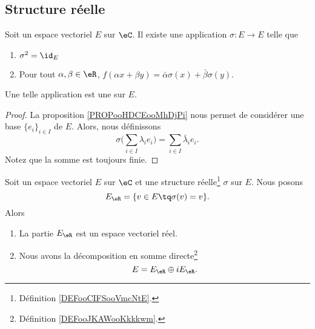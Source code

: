 \subsection{Structure réelle}

\begin{propositionDef}         \label{DEFooCIFSooVmcNtE}
	Soit un espace vectoriel \( E\) sur \( \eC\). Il existe une application \( \sigma\colon E\to E\) telle que
	\begin{enumerate}
		\item
		      \( \sigma^2=\id_E\)
		\item
		      Pour tout \( \alpha,\beta\in \eR\), \( f(\alpha x+\beta y)=\bar \alpha \sigma(x)+\bar \beta \sigma(y)\).
	\end{enumerate}
	Une telle application est une  sur \( E\).
\end{propositionDef}

\begin{proof}
	La proposition \ref{PROPooHDCEooMhDjPi} nous permet de considérer une base \( \{ e_i \}_{i\in I}\) de \( E\). Alors, nous définissons
	\begin{equation}
		\sigma\big( \sum_{i\in I}\lambda_ie_i \big)=\sum_{i\in I}\bar\lambda_ie_i.
	\end{equation}
	Notez que la somme est toujours finie.
\end{proof}

\begin{proposition}     \label{PROPooPZHPooNdarzg}
	Soit un espace vectoriel \( E\) sur \( \eC\) et une structure réelle\footnote{Définition \ref{DEFooCIFSooVmcNtE}.} \( \sigma\) sur \( E\). Nous posons
	\begin{equation}
		E_{\eR}=\{ v\in E\tq \sigma(v)=v \}.
	\end{equation}
	Alors
	\begin{enumerate}
		\item
		      La partie \( E_{\eR}\) est un espace vectoriel réel.
		\item
		      Nous avons la décomposition en somme directe\footnote{Définition \ref{DEFooJKAWooKkkkwm}.}
		      \begin{equation}
			      E=E_{\eR}\oplus iE_{\eR}.
		      \end{equation}
	\end{enumerate}
\end{proposition}

